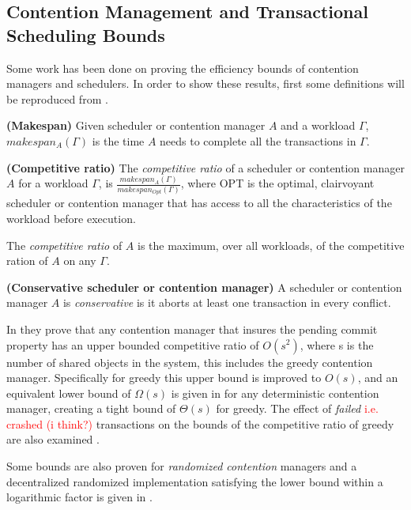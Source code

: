\subsection{Contention Management and Transactional Scheduling Bounds}

Some work has been done on proving the efficiency bounds of contention managers and schedulers.
In order to show these results, first some definitions will be reproduced from \cite{1696831}.

\begin{definition}
\textbf{(Makespan)}
Given scheduler or contention manager $A$ and a workload $\Gamma$, $makespan_A(\Gamma)$ is the time $A$ needs to complete all the transactions in $\Gamma$.
\end{definition}

\begin{definition}
\textbf{(Competitive ratio)}
The \emph{competitive ratio} of a scheduler or contention manager $A$ for a workload $\Gamma$, is $\frac{makespan_A(\Gamma)}{makespan_{Opt}(\Gamma)}$, where OPT is the optimal, clairvoyant scheduler or contention manager that has access to all the characteristics of the workload before execution.

The \emph{competitive ratio} of $A$ is the maximum, over all workloads, of the competitive ration of $A$ on any $\Gamma$.
\end{definition}

\begin{definition}
\textbf{(Conservative scheduler or contention manager)}
A scheduler or contention manager $A$ is \emph{conservative} is it aborts at least one transaction in every conflict.
\end{definition}

In \cite{1073863} they prove that any contention manager that insures the pending commit property has an upper bounded competitive ratio of $O(s^{2})$, where s is the number of shared objects in the system, this includes the greedy contention manager.
Specifically for greedy this upper bound is improved to $O(s)$, and an equivalent lower bound of $\Omega(s)$ is given in \cite{1146428} for any deterministic contention manager, creating a tight bound of $\Theta(s)$ for greedy.
The effect of \emph{failed} \textcolor{Red}{i.e. crashed (i think?)} transactions on the bounds of the competitive ratio of greedy are also examined \cite{1146428}. 

Some bounds are also proven for \emph{randomized contention} managers \cite{1146428} and a decentralized randomized implementation satisfying the lower bound within a logarithmic factor is given in \cite{1146428}.

